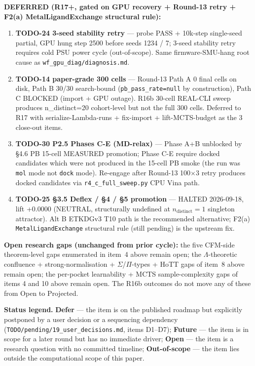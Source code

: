\textbf{DEFERRED (R17+, gated on GPU recovery + Round-13 retry
+ F2(a) MetalLigandExchange structural rule):}
\begin{enumerate}
  \item \textbf{TODO-24 3-seed stability retry} --- probe PASS +
        10k-step single-seed partial, GPU hung step 2500 before
        seeds 1234 / 7; 3-seed stability retry requires cold PSU
        power cycle (out-of-scope). Same firmware-SMU-hang root
        cause as \texttt{wf\_gpu\_diag/diagnosis.md}.
  \item \textbf{TODO-14 paper-grade 300 cells} --- Round-13
        Path A 0 final cells on disk, Path B 30/30 search-bound
        (\texttt{pb\_pass\_rate=null} by construction), Path C
        BLOCKED (import + GPU outage). R16b 30-cell REAL-CLI
        sweep produces n\_distinct=20 cohort-level but not the
        full 300 cells. Deferred to R17 with serialize-Lambda-runs
        + fix-import + lift-MCTS-budget as the 3 close-out items.
  \item \textbf{TODO-30 P2.5 Phases C-E (MD-relax)} --- Phase A+B
        unblocked by §4.6 PB 15-cell MEASURED promotion; Phase
        C-E require docked candidates which were not produced in
        the 15-cell PB smoke (the run was \texttt{mol} mode not
        \texttt{dock} mode). Re-engage after Round-13 100$\times$3
        retry produces docked candidates via
        \texttt{r4\_c\_full\_sweep.py} CPU Vina path.
  \item \textbf{TODO-25 §3.5 Deflex / §4 / §5 promotion} ---
        HALTED 2026-09-18, lift +0.0000 (NEUTRAL, structurally
        undefined at $n_{\text{distinct}}{=}1$ singleton
        attractor). Alt B ETKDGv3 T10 path is the recommended
        alternative; F2(a) \texttt{MetalLigandExchange} structural
        rule (still pending) is the upstream fix.
\end{enumerate}

\textbf{Open research gaps (unchanged from prior cycle):}
the five CFM-side theorem-level gaps enumerated in item~4
above remain open; the $\Lambda$-theoretic confluence +
strong-normalisation + $\Sigma$/$\Pi$-types + HoTT gaps of
item~8 above remain open; the per-pocket learnability + MCTS
sample-complexity gaps of items 4 and 10 above remain open.
The R16b outcomes do not move any of these from Open to
Projected.

\noindent\textbf{Status legend.}
\textbf{Defer} --- the item is on the published roadmap but explicitly
postponed by a user decision or a sequencing dependency
(\texttt{TODO/pending/19\_user\_decisions.md}, items D1--D7);
\textbf{Future} --- the item is in scope for a later round but has
no immediate driver; \textbf{Open} --- the item is a research
question with no committed timeline;
\textbf{Out-of-scope} --- the item lies outside the computational
scope of this paper.
